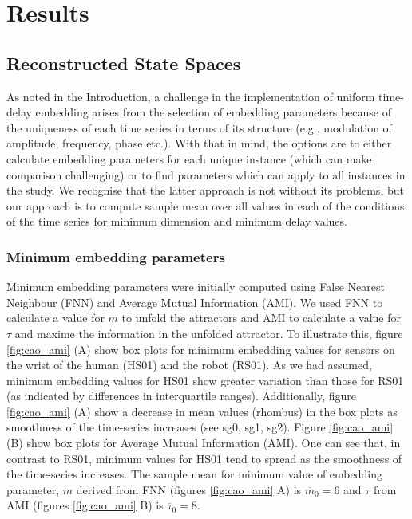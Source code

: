 \documentclass[fleqn,10pt]{wlscirep}
\begin{document}
\section*{Results}

\subsection*{Reconstructed State Spaces}
As noted in the Introduction, a challenge in the implementation of uniform time-delay embedding 
arises from the selection of embedding parameters because of the uniqueness of each time series 
in terms of its structure (e.g., modulation of amplitude, frequency, phase etc.). 
With that in mind, the options are to either calculate embedding parameters for each unique 
instance (which can make comparison challenging) or to find parameters which can apply to all 
instances in the study.
We recognise that the latter approach is not without its problems, 
but our approach is to compute sample mean over all values in each of the conditions of the 
time series for minimum dimension and minimum delay values.

\subsubsection*{Minimum embedding parameters}
Minimum embedding parameters were initially computed using False Nearest Neighbour (FNN) 
and Average Mutual Information (AMI).   We used FNN to calculate a value for $m$
to unfold the attractors and AMI to calculate a value for $\tau$ and maxime the 
information in the unfolded attractor.
To illustrate this, figure \ref{fig:cao_ami} (A) show box plots for minimum embedding 
values for sensors on the wrist of the human (HS01) and the robot (RS01).   
As we had assumed, minimum embedding values for HS01 show greater variation than 
those for RS01 (as indicated by differences in interquartile ranges).  
Additionally, figure \ref{fig:cao_ami} (A) show a decrease in mean values (rhombus) in the box plots 
as smoothness of the time-series increases (see sg0, sg1, sg2).  
Figure \ref{fig:cao_ami} (B) show box plots for Average Mutual Information (AMI).  
One can see that, in contrast to RS01, minimum values for HS01 tend to spread 
as the smoothness of the time-series increases.
The sample mean for minimum value of embedding parameter, 
$m$ derived from FNN  (figures \ref{fig:cao_ami} A) is $\overline{m}_0=6$ 
and $\tau$ from AMI (figures \ref{fig:cao_ami} B) is $\overline{\tau}_0=8$.
\end{document}
